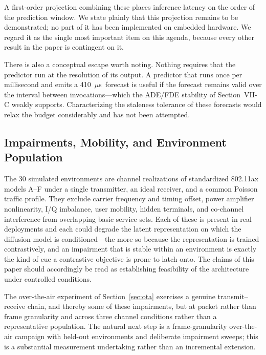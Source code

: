 \documentclass[lettersize,journal]{IEEEtran}
\newcommand{\us}{\ensuremath{\mu}s}
\begin{document}
A first-order projection combining these places inference latency on the
order of the prediction window. We state plainly that this projection
remains to be demonstrated; no part of it has been implemented on
embedded hardware. We regard it as the single most important item on
this agenda, because every other result in the paper is contingent on
it.

There is also a conceptual escape worth noting. Nothing requires that
the predictor run at the resolution of its output. A predictor that runs
once per millisecond and emits a 410~\us\ forecast is useful if the
forecast remains valid over the interval between invocations---which the
ADE/FDE stability of Section~VII-C weakly supports. Characterizing the
staleness tolerance of these forecasts would relax the budget
considerably and has not been attempted.

\subsection{\textbf{Impairments, Mobility, and Environment Population}}
The 30 simulated environments are channel realizations of standardized
802.11ax models A--F under a single transmitter, an ideal receiver, and
a common Poisson traffic profile. They exclude carrier frequency and
timing offset, power amplifier nonlinearity, I/Q imbalance, user
mobility, hidden terminals, and co-channel interference from overlapping
basic service sets. Each of these is present in real deployments and each
could degrade the latent representation on which the diffusion model is
conditioned---the more so because the representation is trained
contrastively, and an impairment that is stable within an environment is
exactly the kind of cue a contrastive objective is prone to latch onto.
The claims of this paper should accordingly be read as establishing
feasibility of the architecture under controlled conditions.

The over-the-air experiment of Section~\ref{sec:ota} exercises a genuine
transmit--receive chain, and thereby some of these impairments, but at
packet rather than frame granularity and across three channel conditions
rather than a representative population. The natural next step is a
frame-granularity over-the-air campaign with held-out environments and
deliberate impairment sweeps; this is a substantial measurement
undertaking rather than an incremental extension.
\end{document}

